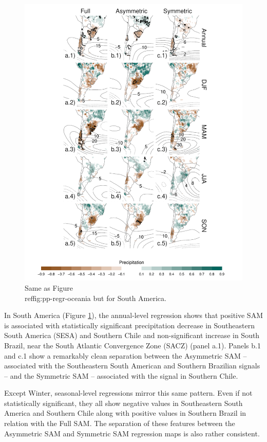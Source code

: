 \documentclass[]{ametsocV5}
\begin{document}
\begin{figure}
\includegraphics{pp-regr-america-1} \caption[Same as Figure \\ref{fig:pp-regr-oceania} but for South America]{Same as Figure \\ref{fig:pp-regr-oceania} but for South America.}\label{fig:pp-regr-america}
\end{figure}

In South America (Figure \ref{fig:pp-regr-america}), the annual-level regression shows that positive SAM is associated with statistically significant precipitation decrease in Southeastern South America (SESA) and Southern Chile and non-significant increase in South Brazil, near the South Atlantic Convergence Zone (SACZ) (panel a.1). Panels b.1 and c.1 show a remarkably clean separation between the Asymmetric SAM -- associated with the Southeastern South American and Southern Brazilian signals -- and the Symmetric SAM -- associated with the signal in Southern Chile.

Except Winter, seasonal-level regressions mirror this same pattern. Even if not statistically significant, they all show negative values in Southeastern South America and Southern Chile along with positive values in Southern Brazil in relation with the Full SAM. The separation of these features between the Asymmetric SAM and Symmetric SAM regression maps is also rather consistent.
\end{document}
